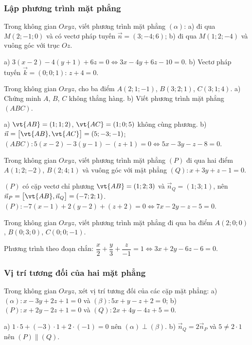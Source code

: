 \subsubsection{Lập phương trình mặt phẳng}
\begin{vidu}
Trong không gian $Oxyz$, viết phương trình mặt phẳng $(\alpha)$: a) đi qua $M(2;-1;0)$ và có vectơ pháp tuyến $\vec n=(3;-4;6)$; b) đi qua $M(1;2;-4)$ và vuông góc với trục $Oz$.
\begin{loigiai}
a) $3(x-2)-4(y+1)+6z=0\Leftrightarrow3x-4y+6z-10=0$. b) Vectơ pháp tuyến $\vec k=(0;0;1)$: $z+4=0$.
\end{loigiai}
\end{vidu}

\begin{vidu}
Trong không gian $Oxyz$, cho ba điểm $A(2;1;-1)$, $B(3;2;1)$, $C(3;1;4)$. a) Chứng minh $A$, $B$, $C$ không thẳng hàng. b) Viết phương trình mặt phẳng $(ABC)$.
\begin{loigiai}
a) $\vt{AB}=(1;1;2)$, $\vt{AC}=(1;0;5)$ không cùng phương. b) $\vec n=\big[\vt{AB},\vt{AC}\big]=(5;-3;-1)$; $(ABC)\colon5(x-2)-3(y-1)-(z+1)=0\Leftrightarrow5x-3y-z-8=0$.
\end{loigiai}
\end{vidu}

\begin{vidu}
Trong không gian $Oxyz$, viết phương trình mặt phẳng $(P)$ đi qua hai điểm $A(1;2;-2)$, $B(2;4;1)$ và vuông góc với mặt phẳng $(Q)\colon x+3y+z-1=0$.
\begin{loigiai}
$(P)$ có cặp vectơ chỉ phương $\vt{AB}=(1;2;3)$ và $\vec n_Q=(1;3;1)$, nên $\vec n_P=\big[\vt{AB},\vec n_Q\big]=(-7;2;1)$. $(P)\colon-7(x-1)+2(y-2)+(z+2)=0\Leftrightarrow7x-2y-z-5=0$.
\end{loigiai}
\end{vidu}

\begin{vidu}
Trong không gian $Oxyz$, viết phương trình mặt phẳng đi qua ba điểm $A(2;0;0)$, $B(0;3;0)$, $C(0;0;-1)$.
\begin{loigiai}
Phương trình theo đoạn chắn: $\dfrac x2+\dfrac y3+\dfrac z{-1}=1\Leftrightarrow3x+2y-6z-6=0$.
\end{loigiai}
\end{vidu}

\subsubsection{Vị trí tương đối của hai mặt phẳng}
\begin{vidu}
Trong không gian $Oxyz$, xét vị trí tương đối của các cặp mặt phẳng: a) $(\alpha)\colon x-3y+2z+1=0$ và $(\beta)\colon5x+y-z+2=0$; b) $(P)\colon x+2y-2z+1=0$ và $(Q)\colon2x+4y-4z+5=0$.
\begin{loigiai}
a) $1\cdot5+(-3)\cdot1+2\cdot(-1)=0$ nên $(\alpha)\perp(\beta)$. b) $\vec n_Q=2\vec n_P$ và $5\ne2\cdot1$ nên $(P)\parallel(Q)$.
\end{loigiai}
\end{vidu}

